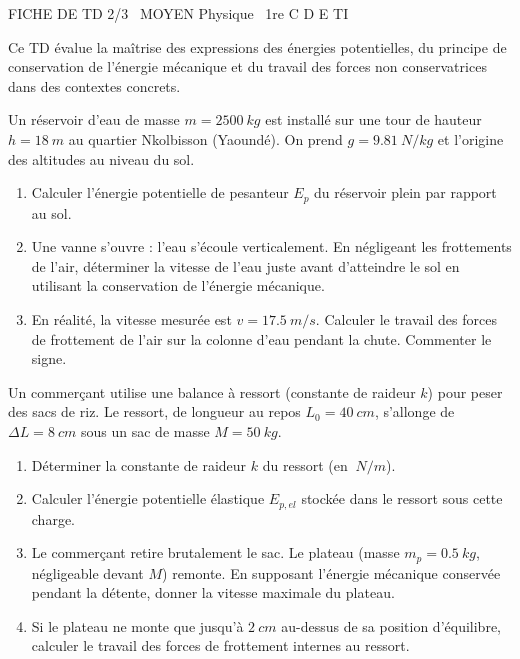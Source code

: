 \documentclass[11pt]{article}
\begin{document}
\begin{tcolorbox}[enhanced,colback=popink,colframe=popink,arc=10pt,boxrule=0pt,left=12pt,right=12pt,top=9pt,bottom=9pt]
{\color{white}\popxbold\small FICHE DE TD 2/3 \textbullet\ MOYEN \hfill Physique \textbullet\ 1re C D E TI\par}
\end{tcolorbox}
\vspace{4pt}
Ce TD évalue la maîtrise des expressions des énergies potentielles, du principe de conservation de l'énergie mécanique et du travail des forces non conservatrices dans des contextes concrets.

\begin{exercice}
Un réservoir d'eau de masse $m = \SI{2500}{kg}$ est installé sur une tour de hauteur $h = \SI{18}{m}$ au quartier Nkolbisson (Yaoundé). On prend $g = \SI{9,81}{N/kg}$ et l'origine des altitudes au niveau du sol.
\begin{enumerate}
    \item Calculer l'énergie potentielle de pesanteur $E_p$ du réservoir plein par rapport au sol.
    \item Une vanne s'ouvre : l'eau s'écoule verticalement. En négligeant les frottements de l'air, déterminer la vitesse de l'eau juste avant d'atteindre le sol en utilisant la conservation de l'énergie mécanique.
    \item En réalité, la vitesse mesurée est $v = \SI{17,5}{m/s}$. Calculer le travail des forces de frottement de l'air sur la colonne d'eau pendant la chute. Commenter le signe.
\end{enumerate}
\end{exercice}

\begin{exercice}
Un commerçant utilise une balance à ressort (constante de raideur $k$) pour peser des sacs de riz. Le ressort, de longueur au repos $L_0 = \SI{40}{cm}$, s'allonge de $\Delta L = \SI{8}{cm}$ sous un sac de masse $M = \SI{50}{kg}$.
\begin{enumerate}
    \item Déterminer la constante de raideur $k$ du ressort (en $\SI{}{N/m}$).
    \item Calculer l'énergie potentielle élastique $E_{p,el}$ stockée dans le ressort sous cette charge.
    \item Le commerçant retire brutalement le sac. Le plateau (masse $m_p = \SI{0,5}{kg}$, négligeable devant $M$) remonte. En supposant l'énergie mécanique conservée pendant la détente, donner la vitesse maximale du plateau.
    \item Si le plateau ne monte que jusqu'à $\SI{2}{cm}$ au-dessus de sa position d'équilibre, calculer le travail des forces de frottement internes au ressort.
\end{enumerate}
\end{exercice}
\end{document}

